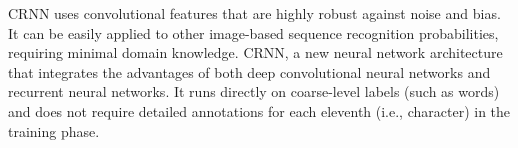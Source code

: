 \documentclass{article}
\begin{document}

CRNN uses convolutional features that are highly robust against noise and bias. It can be easily applied to other image-based sequence recognition probabilities, requiring minimal domain knowledge.
CRNN, a new neural network architecture that integrates the advantages of both deep convolutional neural networks and recurrent neural networks. It runs directly on coarse-level labels (such as words) and does not require detailed annotations for each eleventh (i.e., character) in the training phase.
\end{document}
